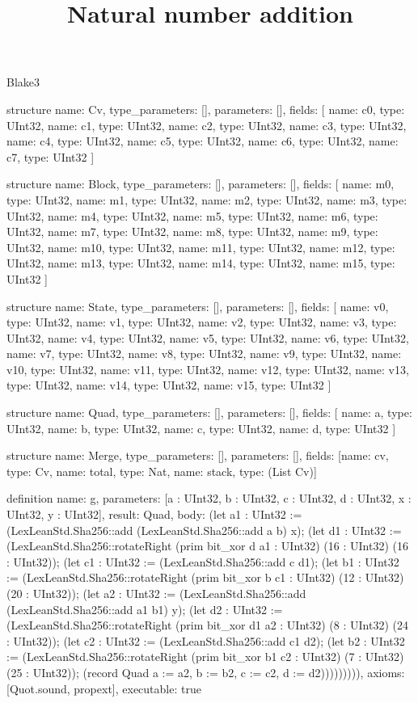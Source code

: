 \begin{lexlean}{Blake3}
\title{Natural number addition}
\begin{semanticmodule}
structure{
  name: Cv,
  type_parameters: [],
  parameters: [],
  fields: [
    {name: c0, type: UInt32},
    {name: c1, type: UInt32},
    {name: c2, type: UInt32},
    {name: c3, type: UInt32},
    {name: c4, type: UInt32},
    {name: c5, type: UInt32},
    {name: c6, type: UInt32},
    {name: c7, type: UInt32}
  ]
}

structure{
  name: Block,
  type_parameters: [],
  parameters: [],
  fields: [
    {name: m0, type: UInt32},
    {name: m1, type: UInt32},
    {name: m2, type: UInt32},
    {name: m3, type: UInt32},
    {name: m4, type: UInt32},
    {name: m5, type: UInt32},
    {name: m6, type: UInt32},
    {name: m7, type: UInt32},
    {name: m8, type: UInt32},
    {name: m9, type: UInt32},
    {name: m10, type: UInt32},
    {name: m11, type: UInt32},
    {name: m12, type: UInt32},
    {name: m13, type: UInt32},
    {name: m14, type: UInt32},
    {name: m15, type: UInt32}
  ]
}

structure{
  name: State,
  type_parameters: [],
  parameters: [],
  fields: [
    {name: v0, type: UInt32},
    {name: v1, type: UInt32},
    {name: v2, type: UInt32},
    {name: v3, type: UInt32},
    {name: v4, type: UInt32},
    {name: v5, type: UInt32},
    {name: v6, type: UInt32},
    {name: v7, type: UInt32},
    {name: v8, type: UInt32},
    {name: v9, type: UInt32},
    {name: v10, type: UInt32},
    {name: v11, type: UInt32},
    {name: v12, type: UInt32},
    {name: v13, type: UInt32},
    {name: v14, type: UInt32},
    {name: v15, type: UInt32}
  ]
}

structure{
  name: Quad,
  type_parameters: [],
  parameters: [],
  fields: [
    {name: a, type: UInt32},
    {name: b, type: UInt32},
    {name: c, type: UInt32},
    {name: d, type: UInt32}
  ]
}

structure{
  name: Merge,
  type_parameters: [],
  parameters: [],
  fields: [{name: cv, type: Cv}, {name: total, type: Nat}, {name: stack, type: (List Cv)}]
}

definition{
  name: g,
  parameters: [a : UInt32, b : UInt32, c : UInt32, d : UInt32, x : UInt32, y : UInt32],
  result: Quad,
  body: (let a1 : UInt32 := (LexLeanStd.Sha256::add (LexLeanStd.Sha256::add a b) x); (let d1 : UInt32 := (LexLeanStd.Sha256::rotateRight (prim bit_xor d a1 : UInt32) (16 : UInt32) (16 : UInt32)); (let c1 : UInt32 := (LexLeanStd.Sha256::add c d1); (let b1 : UInt32 := (LexLeanStd.Sha256::rotateRight (prim bit_xor b c1 : UInt32) (12 : UInt32) (20 : UInt32)); (let a2 : UInt32 := (LexLeanStd.Sha256::add (LexLeanStd.Sha256::add a1 b1) y); (let d2 : UInt32 := (LexLeanStd.Sha256::rotateRight (prim bit_xor d1 a2 : UInt32) (8 : UInt32) (24 : UInt32)); (let c2 : UInt32 := (LexLeanStd.Sha256::add c1 d2); (let b2 : UInt32 := (LexLeanStd.Sha256::rotateRight (prim bit_xor b1 c2 : UInt32) (7 : UInt32) (25 : UInt32)); (record Quad {a := a2, b := b2, c := c2, d := d2}))))))))),
  axioms: [Quot.sound, propext],
  executable: true
}


\end{semanticmodule}
\end{lexlean}
